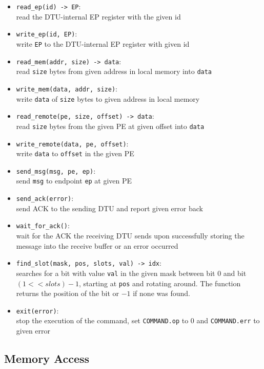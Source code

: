 \documentclass[a4paper,11pt,draft]{article}
\begin{document}
\begin{itemize}
  \item \texttt{read\_ep(id) -> EP}:\\
  read the DTU-internal EP register with the given id
  \item \texttt{write\_ep(id, EP)}:\\
  write \texttt{EP} to the DTU-internal EP register with given id
  \item \texttt{read\_mem(addr, size) -> data}:\\
  read \texttt{size} bytes from given address in local memory into \texttt{data}
  \item \texttt{write\_mem(data, addr, size)}:\\
  write \texttt{data} of \texttt{size} bytes to given address in local memory
  \item \texttt{read\_remote(pe, size, offset) -> data}:\\
  read \texttt{size} bytes from the given PE at given offset into \texttt{data}
  \item \texttt{write\_remote(data, pe, offset)}:\\
  write \texttt{data} to \texttt{offset} in the given PE
  \item \texttt{send\_msg(msg, pe, ep)}:\\
  send \texttt{msg} to endpoint \texttt{ep} at given PE
  \item \texttt{send\_ack(error)}:\\
  send ACK to the sending DTU and report given error back
  \item \texttt{wait\_for\_ack()}:\\
  wait for the ACK the receiving DTU sends upon successfully storing the message into the receive
  buffer or an error occurred
  \item \texttt{find\_slot(mask, pos, slots, val) -> idx}:\\
  searches for a bit with value \texttt{val} in the given mask between bit 0 and bit $(1 << slots) -
  1$, starting at \texttt{pos} and rotating around. The function returns the position of the bit or
  $-1$ if none was found.
  \item \texttt{exit(error)}:\\
  stop the execution of the command, set \texttt{COMMAND.op} to 0 and \texttt{COMMAND.err} to given error
\end{itemize}

\subsection{Memory Access}
\end{document}
